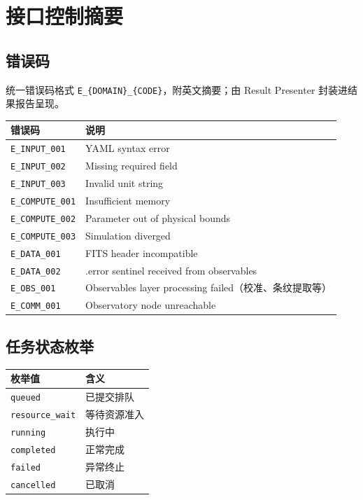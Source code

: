 \section{接口控制摘要}
\label{sec:icd-summary}

\subsection{错误码}

统一错误码格式 \texttt{E\_\{DOMAIN\}\_\{CODE\}}，附英文摘要；由 Result Presenter 封装进结果报告呈现。

\begin{center}
\begin{tabular}{ll}
\toprule
错误码 & 说明 \\
\midrule
\texttt{E\_INPUT\_001} & YAML syntax error \\
\texttt{E\_INPUT\_002} & Missing required field \\
\texttt{E\_INPUT\_003} & Invalid unit string \\
\texttt{E\_COMPUTE\_001} & Insufficient memory \\
\texttt{E\_COMPUTE\_002} & Parameter out of physical bounds \\
\texttt{E\_COMPUTE\_003} & Simulation diverged \\
\texttt{E\_DATA\_001} & FITS header incompatible \\
\texttt{E\_DATA\_002} & .error sentinel received from observables \\
\texttt{E\_OBS\_001} & Observables layer processing failed（校准、条纹提取等） \\
\texttt{E\_COMM\_001} & Observatory node unreachable \\
\bottomrule
\end{tabular}
\end{center}

\subsection{任务状态枚举}

\begin{center}
\begin{tabular}{ll}
\toprule
枚举值 & 含义 \\
\midrule
\texttt{queued} & 已提交排队 \\
\texttt{resource\_wait} & 等待资源准入 \\
\texttt{running} & 执行中 \\
\texttt{completed} & 正常完成 \\
\texttt{failed} & 异常终止 \\
\texttt{cancelled} & 已取消 \\
\bottomrule
\end{tabular}
\end{center}

